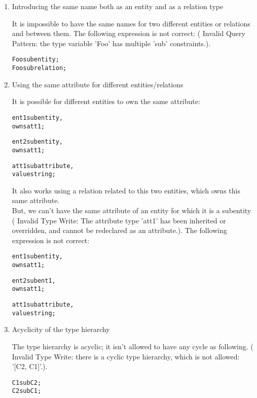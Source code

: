 \documentclass{article}
\begin{document}
\begin{enumerate}

\item Introducing the same name both as an entity and as a relation type

It is impossible to have the same names for two different entities or relations and between them.
The following expression is not correct: ( Invalid Query Pattern: the type variable 'Foo' has multiple 'sub' constraints.).

  \begin{alltt}
    Foo sub entity;
    Foo sub relation;
  \end{alltt}


\item Using the same attribute for different entities/relations

It is possible for different entities to own the same attribute:

  \begin{alltt}
     ent1 sub entity,
       owns att1;
     	
     ent2 sub entity,
       owns att1;
    		
    	 att1 sub attribute,
       value string;
  \end{alltt}
  
It also works using a relation related to this two entities, which owns this same attribute. \\
But, we can't have the same attribute of an entity for which it is a subentity ( Invalid Type Write: The attribute type 'att1' has been inherited or overridden, and cannot be redeclared as an attribute.). The following expression is not correct:

\begin{alltt}
     ent1 sub entity,
       owns att1;
     	
     ent2 sub ent1,
       owns att1;
    		
    	 att1 sub attribute,
       value string;
  \end{alltt}
	
\item Acyclicity of the type hierarchy

The type hierarchy is acyclic; it isn't allowed to have any cycle as following. ( Invalid Type Write: there is a cyclic type hierarchy, which is not allowed: '[C2, C1]'.).

  \begin{alltt}
    C1 sub C2;
    C2 sub C1;
  \end{alltt}



\end{enumerate}
\end{document}
